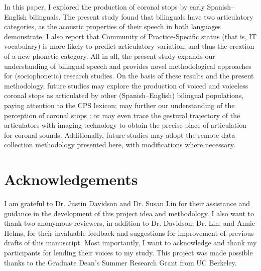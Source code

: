 \documentclass[output=paper,colorlinks,citecolor=brown,
]{langscibook}
\begin{document}
In this paper, I explored the production of coronal stops by early Spanish–English bilinguals. The present study found that bilinguals have two articulatory categories, as the acoustic properties of their speech in both languages demonstrate. I also report that Community of Practice-Specific status (that is, IT vocabulary) is more likely to predict articulatory variation, and thus the creation of a new phonetic category. All in all, the present study expands our understanding of bilingual speech and provides novel methodological approaches for (sociophonetic) research studies. On the basis of these results and the present methodology, future studies may explore the production of voiced and voiceless coronal stops as articulated by other (Spanish–English) bilingual populations, paying attention to the CPS lexicon; may further our understanding of the perception of coronal stops \citep[e.g.][]{melguy2018exploring}; or may even trace the gestural trajectory of the articulators with imaging technology to obtain the precise place of articulation for coronal sounds. Additionally, future studies may adopt the remote data collection methodology presented here, with modifications where necessary.

\section*{Acknowledgements}
I am grateful to Dr. Justin Davidson and Dr. Susan Lin for their assistance and guidance in the development of this project idea and methodology. I also want to thank two anonymous reviewers, in addition to Dr. Davidson, Dr. Lin, and Annie Helms, for their invaluable feedback and suggestions for improvement of previous drafts of this manuscript. Most importantly, I want to acknowledge and thank my participants for lending their voices to my study. This project was made possible thanks to the Graduate Dean's Summer Research Grant from UC Berkeley.

\printbibliography[heading=subbibliography,notkeyword=this]
\end{document}
